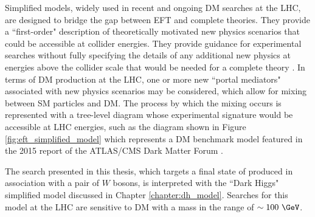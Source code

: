 Simplified models, widely used in recent and ongoing DM searches at the LHC, are designed to bridge the gap between EFT and complete theories. They provide a ``first-order" description of theoretically motivated new physics scenarios that could be accessible at collider energies. They provide guidance for experimental searches without fully specifying the details of any additional new physics at energies above the collider scale that would be needed for a complete theory \cite{DM_colliders}. In terms of DM production at the LHC, one or more new ``portal mediators" associated with new physics scenarios may be considered, which allow for mixing between SM particles and DM. The process by which the mixing occurs is represented with a tree-level diagram whose experimental signature would be accessible at LHC energies, such as the diagram shown in Figure \ref{fig:eft_simplified_model} which represents a DM benchmark model featured in the 2015 report of the ATLAS/CMS Dark Matter Forum \cite{dm_forum}. 

The search presented in this thesis, which targets a final state of \met produced in association with a pair of \(W\) bosons, is interpreted with the ``Dark Higgs" simplified model \cite{Duerr2017} discussed in Chapter \ref{chapter:dh_model}. Searches for this model at the LHC are sensitive to DM with a mass in the range of \(\sim100~\GeV\).

